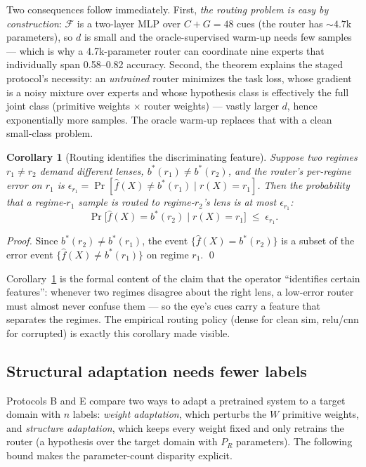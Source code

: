 \documentclass[11pt,a4paper]{article}
\newtheorem{corollary}[theorem]{Corollary}
\begin{document}
Two consequences follow immediately. First, \emph{the routing problem is easy
by construction}: $\mathcal{F}$ is a two-layer MLP over $C{+}G = 48$ cues (the
router has ${\sim}4.7$k parameters), so $d$ is small and the oracle-supervised
warm-up needs few samples — which is why a 4.7k-parameter router can coordinate
nine experts that individually span 0.58--0.82 accuracy. Second, the theorem
explains the staged protocol's necessity: an \emph{untrained} router minimizes
the task loss, whose gradient is a noisy mixture over experts and whose
hypothesis class is effectively the full joint class (primitive weights $\times$
router weights) — vastly larger $d$, hence exponentially more samples. The
oracle warm-up replaces that with a clean small-class problem.

\begin{corollary}[Routing identifies the discriminating feature]
\label{cor:feature}
Suppose two regimes $r_1\neq r_2$ demand different lenses, $b^*(r_1)\neq
b^*(r_2)$, and the router's per-regime error on $r_1$ is $\epsilon_{r_1} =
\Pr[\hat{f}(X)\neq b^*(r_1)\mid r(X)=r_1]$. Then the probability that a
regime-$r_1$ sample is routed to regime-$r_2$'s lens is at most $\epsilon_{r_1}$:
\[
  \Pr\big[\hat{f}(X)= b^*(r_2)\mid r(X)=r_1\big] \;\leq\; \epsilon_{r_1}.
\]
\end{corollary}

\begin{proof}
Since $b^*(r_2)\neq b^*(r_1)$, the event $\{\hat{f}(X)=b^*(r_2)\}$ is a subset
of the error event $\{\hat{f}(X)\neq b^*(r_1)\}$ on regime $r_1$. \qed
\end{proof}

Corollary~\ref{cor:feature} is the formal content of the claim that the
operator ``identifies certain features'': whenever two regimes disagree about
the right lens, a low-error router must almost never confuse them — so the eye's
cues carry a feature that separates the regimes. The empirical routing policy
(dense for clean sim, relu/cnn for corrupted) is exactly this corollary made
visible.

\subsection{Structural adaptation needs fewer labels}
\label{sec:theory-structure}

Protocols B and E compare two ways to adapt a pretrained system to a target
domain with $n$ labels: \emph{weight adaptation}, which perturbs the $W$
primitive weights, and \emph{structure adaptation}, which keeps every weight
fixed and only retrains the router (a hypothesis over the target domain with
$P_R$ parameters). The following bound makes the parameter-count disparity
explicit.
\end{document}
